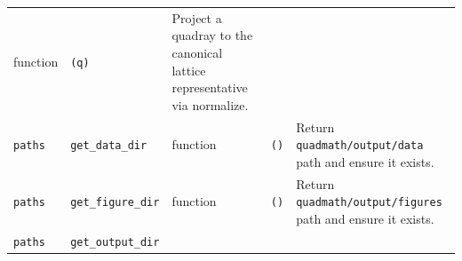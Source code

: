 \documentclass[
  10pt,
]{article}
\begin{document}
\begin{longtable}[]{@{}lllll@{}}
\begin{minipage}[t]{0.17\columnwidth}
function\strut
\end{minipage} & \begin{minipage}[t]{0.17\columnwidth}\raggedright
\texttt{(q)}\strut
\end{minipage} & \begin{minipage}[t]{0.17\columnwidth}\raggedright
Project a quadray to the canonical lattice representative via
normalize.\strut
\end{minipage}\tabularnewline
\begin{minipage}[t]{0.17\columnwidth}\raggedright
\texttt{paths}\strut
\end{minipage} & \begin{minipage}[t]{0.17\columnwidth}\raggedright
\texttt{get\_data\_dir}\strut
\end{minipage} & \begin{minipage}[t]{0.17\columnwidth}\raggedright
function\strut
\end{minipage} & \begin{minipage}[t]{0.17\columnwidth}\raggedright
\texttt{()}\strut
\end{minipage} & \begin{minipage}[t]{0.17\columnwidth}\raggedright
Return \texttt{quadmath/output/data} path and ensure it exists.\strut
\end{minipage}\tabularnewline
\begin{minipage}[t]{0.17\columnwidth}\raggedright
\texttt{paths}\strut
\end{minipage} & \begin{minipage}[t]{0.17\columnwidth}\raggedright
\texttt{get\_figure\_dir}\strut
\end{minipage} & \begin{minipage}[t]{0.17\columnwidth}\raggedright
function\strut
\end{minipage} & \begin{minipage}[t]{0.17\columnwidth}\raggedright
\texttt{()}\strut
\end{minipage} & \begin{minipage}[t]{0.17\columnwidth}\raggedright
Return \texttt{quadmath/output/figures} path and ensure it exists.\strut
\end{minipage}\tabularnewline
\begin{minipage}[t]{0.17\columnwidth}\raggedright
\texttt{paths}\strut
\end{minipage} & \begin{minipage}[t]{0.17\columnwidth}\raggedright
\texttt{get\_output\_dir}\strut
\end{minipage} & \begin{minipage}[t]{0.17\columnwidth}\raggedright

\end{minipage}
\end{longtable}
\end{document}
